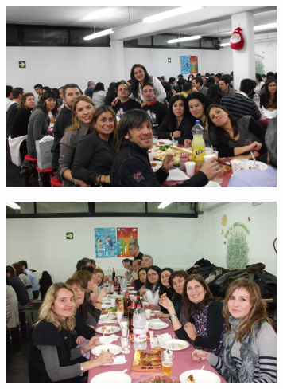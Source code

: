 \begin{news}
\noindent\includegraphics[width=9cm,keepaspectratio]{ampa/img/DSCF0911.JPG}

\noindent\includegraphics[width=9cm,keepaspectratio]{ampa/img/DSCF0920.JPG}


\end{news}
